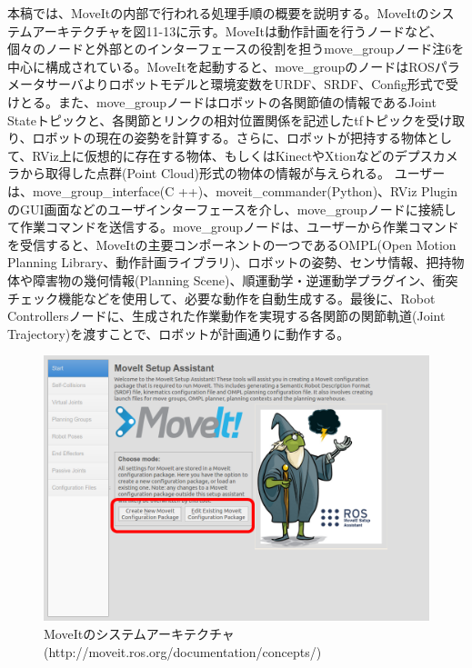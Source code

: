 本稿では、MoveItの内部で行われる処理手順の概要を説明する。MoveItのシステムアーキテクチャを図11-13に示す。MoveItは動作計画を行うノードなど、個々のノードと外部とのインターフェースの役割を担うmove\_groupノード注6を中心に構成されている。MoveItを起動すると、move\_groupのノードはROSパラメータサーバよりロボットモデルと環境変数をURDF、SRDF、Config形式で受けとる。また、move\_groupノードはロボットの各関節値の情報であるJoint Stateトピックと、各関節とリンクの相対位置関係を記述したtfトピックを受け取り、ロボットの現在の姿勢を計算する。さらに、ロボットが把持する物体として、RViz上に仮想的に存在する物体、もしくはKinectやXtionなどのデプスカメラから取得した点群(Point Cloud)形式の物体の情報が与えられる。
ユーザーは、move\_group\_interface(C ++)、moveit\_commander(Python)、RViz PluginのGUI画面などのユーザインターフェースを介し、move\_groupノードに接続して作業コマンドを送信する。move\_groupノードは、ユーザーから作業コマンドを受信すると、MoveItの主要コンポーネントの一つであるOMPL(Open Motion Planning Library、動作計画ライブラリ)、ロボットの姿勢、センサ情報、把持物体や障害物の幾何情報(Planning Scene)、順運動学・逆運動学プラグイン、衝突チェック機能などを使用して、必要な動作を自動生成する。最後に、Robot Controllersノードに、生成された作業動作を実現する各関節の関節軌道(Joint Trajectory)を渡すことで、ロボットが計画通りに動作する。

\begin{figure}[ht]
  \centering
  \includegraphics[width=\columnwidth]{pictures/chapter11/pic_11_13.png}
  \caption{MoveItのシステムアーキテクチャ(http://moveit.ros.org/documentation/concepts/)}
\end{figure}


